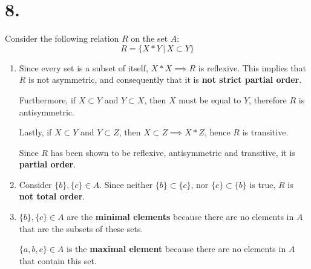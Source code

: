 \documentclass[12pt]{article}
\newcommand{\p}[1]{\item[\textnormal{(#1)}]}
\newenvironment{ps}
{\begin{enumerate}[leftmargin=0em, itemindent=1.5em]}
{\end{enumerate}}
\begin{document}
\section*{8.}
Consider the following relation \( R \) on the set \( A \):
    \[
        R = \{ X*Y \,|\, X \subset Y \}
    \]   
\begin{ps}

    \p{a} Since every set is a subset of itself, \( X*X \implies R\) is reflexive. This implies that
    \( R \) is not asymmetric, and consequently that it is \textbf{not strict partial order}.

    Furthermore, if \( X \subset  Y\) and \( Y \subset X \), then \( X \) must be equal to \( Y \),
    therefore \( R \) is antisymmetric.

    Lastly, if \( X \subset Y \) and \( Y \subset Z \), then \( X \subset Z \implies X*Z \), hence \( R \) is
    transitive.

    Since \( R \) has been shown to be reflexive, antisymmetric and transitive, it is
    \textbf{partial order}.

    \p{b} Consider \( \{b\}, \{c\} \in A \). Since neither \( \{b\} \subset \{c\} \), nor \( \{c\}
    \subset \{b\} \) is true, \( R \) is \textbf{not total order}.

    \p{c} \( \{b\}, \{c\} \in A \) are the \textbf{minimal elements} because there are no elements
    in \( A \) that are the subsets of these sets.

    \( \{a,b,c\} \in A \) is the \textbf{maximal element} because there are no elements in \( A \)
    that contain this set.


\end{ps}
\end{document}
